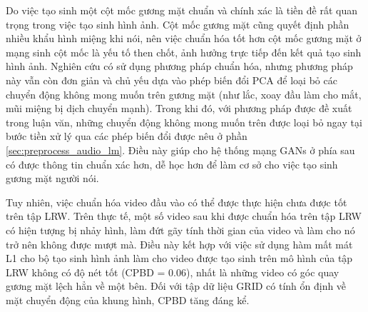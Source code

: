 Do việc tạo sinh một cột mốc gương mặt chuẩn và chính xác là tiền đề rất quan trọng trong việc tạo sinh hình ảnh. Cột mốc gương mặt cũng quyết định phần nhiều khẩu hình miệng khi nói, nên việc chuẩn hóa tốt hơn cột mốc gương mặt ở mạng sinh cột mốc là yếu tố then chốt, ảnh hưởng trực tiếp đến kết quả tạo sinh hình ảnh. Nghiên cứu \cite{chen2019} có sử dụng phương pháp chuẩn hóa, nhưng phương pháp này vẫn còn đơn giản và chủ yếu dựa vào phép biến đổi PCA để loại bỏ các chuyển động không mong muốn trên gương mặt (như lắc, xoay đầu làm cho mắt, mũi miệng bị dịch chuyển mạnh). Trong khi đó, với phương pháp được đề xuất trong luận văn, những chuyển động không mong muốn trên được loại bỏ ngay tại bước tiền xử lý qua các phép biến đổi được nêu ở phần \ref{sec:preprocess_audio_lm}. Điều này giúp cho hệ thống mạng GANs ở phía sau có được thông tin chuẩn xác hơn, dễ học hơn để làm cơ sở cho việc tạo sinh gương mặt người nói.

Tuy nhiên, việc chuẩn hóa video đầu vào có thể được thực hiện chưa được tốt trên tập LRW. Trên thực tế, một số video sau khi được chuẩn hóa trên tập LRW có hiện tượng bị nhảy hình, làm đứt gãy tính thời gian của video và làm cho nó trở nên không được mượt mà. Điều này kết hợp với việc sử dụng hàm mất mát L1 cho bộ tạo sinh hình ảnh làm cho video được tạo sinh trên mô hình của tập LRW không có độ nét tốt (CPBD = 0.06), nhất là những video có góc quay gương mặt lệch hẳn về một bên. Đối với tập dữ liệu GRID có tính ổn định về mặt chuyển động của khung hình, CPBD tăng đáng kể.
